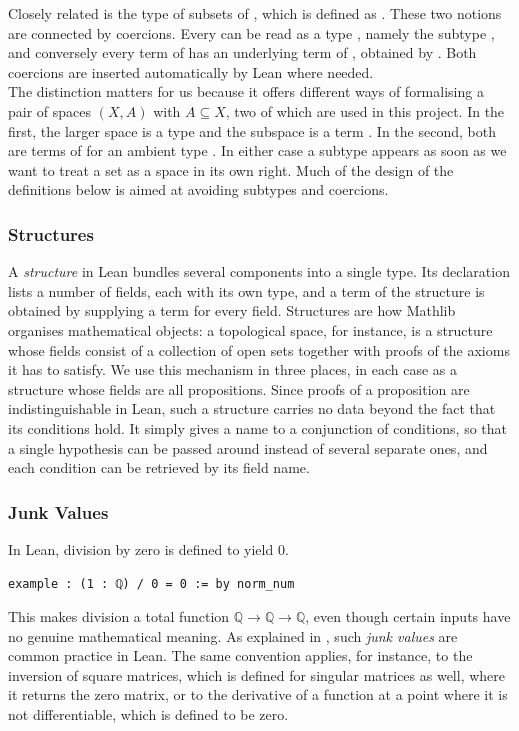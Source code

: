 \documentclass[11pt, a4paper, english]{article}
\theoremstyle{plain}
\theoremstyle{definition}
\theoremstyle{remark}
\numberwithin{equation}{section}
\numberwithin{theorem}{section}
\begin{document}
Closely related is the type  of subsets of , which is defined as . These two notions are connected by coercions. Every  can be read as a type , namely the subtype , and conversely every term of  has an underlying term of , obtained by . Both coercions are inserted automatically by Lean where needed. \\
The distinction matters for us because it offers different ways of formalising a pair of spaces $(X,A)$ with $A \subseteq X$, two of which are used in this project. In the first, the larger space is a type  and the subspace is a term . In the second, both are terms of  for an ambient type . In either case a subtype appears as soon as we want to treat a set as a space in its own right. Much of the design of the definitions below is aimed at avoiding subtypes and coercions.

\subsubsection*{Structures}
A \emph{structure} in Lean bundles several components into a single type. Its declaration lists a number of fields, each with its own type, and a term of the structure is obtained by supplying a term for every field. Structures are how Mathlib organises mathematical objects: a topological space, for instance, is a structure whose fields consist of a collection of open sets together with proofs of the axioms it has to satisfy.
We use this mechanism in three places, in each case as a structure whose fields are all propositions. Since proofs of a proposition are indistinguishable in Lean, such a structure carries no data beyond the fact that its conditions hold. It simply gives a name to a conjunction of conditions, so that a single hypothesis can be passed around instead of several separate ones, and each condition can be retrieved by its field name.

\subsubsection*{Junk Values}
In Lean, division by zero is defined to yield $0$.
\begin{verbatim}
example : (1 : ℚ) / 0 = 0 := by norm_num
\end{verbatim}
This makes division a total function $\mathbb{Q} \to \mathbb{Q} \to \mathbb{Q}$, even though certain inputs have no genuine mathematical meaning. As explained in \cite{Meiburg}, such \emph{junk values} are common practice in Lean. The same convention applies, for instance, to the inversion of square matrices, which is defined for singular matrices as well, where it returns the zero matrix, or to the derivative of a function at a point where it is not differentiable, which is defined to be zero. 
\end{document}

